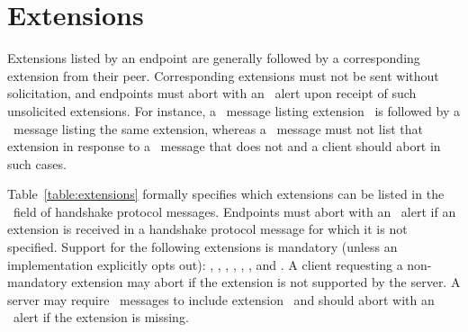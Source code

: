 \section{Extensions}
\label{sec:extensions}

Extensions listed by an endpoint are generally 
followed by a corresponding extension from their peer. 
Corresponding extensions must not be sent without solicitation, and  
endpoints must abort with an \TLSunsupportedExtension\ alert upon 
receipt of such unsolicited extensions. For instance, a \ClientHello\ message listing 
extension \TLSsupportedGroups\ is followed by a \ServerHello\ message listing 
the same extension, whereas a \ServerHello\ message must not list that 
extension in response to a \ClientHello\ message that does not and a client
should abort in such cases. 

Table~\ref{table:extensions} formally specifies which extensions can be listed 
in the \TLSextensions\ field of handshake protocol messages. Endpoints 
must abort with an \TLSillegalParameter\ alert if an extension is received
in a handshake protocol message for which it is not specified. Support for 
the following extensions is mandatory (unless an implementation explicitly opts out): 
%
\TLScookie,
\TLSkeyShare,
\TLSserverName,
\TLSsignatureAlgorithms,
\TLSsignatureAlgorithmsCert,
\TLSsupportedGroups, and
\TLSsupportedVersions.
%
A client requesting a non-mandatory extension may abort if the extension is
not supported by the server. A server may require \ClientHello\ messages
to include extension \TLSserverName\ and should abort with an \TLSmissingExtension\ 
alert if the extension is missing. 


